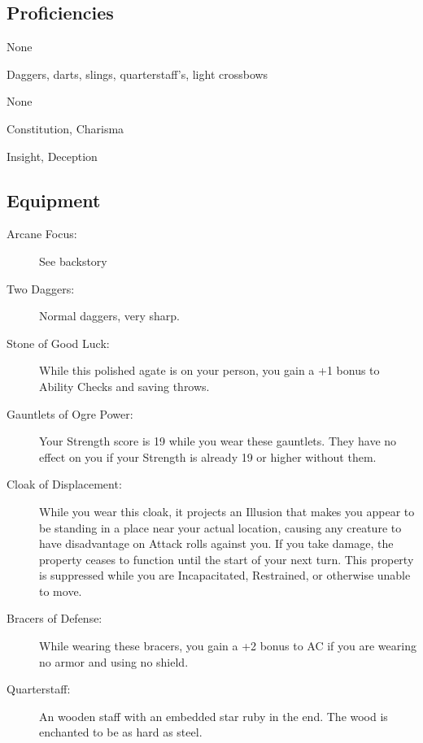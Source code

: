 \documentclass[letterpaper,10pt,twoside,twocolumn,openany]{book}
\begin{document}
\subsection{Proficiencies}

\begin{description}[font=\normalfont\textbf,noitemsep,topsep=1ex,leftmargin=1em]
	\item[Armor:] None
	\item[Weapons:] Daggers, darts, slings, quarterstaff's, light crossbows 
	\item[Tools:] None 
\end{description}

\begin{description}[font=\normalfont\textbf,noitemsep,topsep=1ex,leftmargin=1em]
	\item[Saving Throws:] Constitution, Charisma
	\item[Skills:] Insight, Deception
\end{description}

\subsection{Equipment}

\begin{description}
	\item[Arcane Focus:] See backstory
	\item[Two Daggers:] Normal daggers, very sharp.
	\item[Stone of Good Luck:] While this polished agate is on your person, you gain a +1 bonus to Ability Checks and saving throws.
	\item[Gauntlets of Ogre Power:] Your Strength score is 19 while you wear these gauntlets. They have no effect on you if your Strength is already 19 or higher without them.
	\item[Cloak of Displacement:] While you wear this cloak, it projects an Illusion that makes you appear to be standing in a place near your actual location, causing any creature to have disadvantage on Attack rolls against you. If you take damage, the property ceases to function until the start of your next turn. This property is suppressed while you are Incapacitated, Restrained, or otherwise unable to move.
	\item[Bracers of Defense:] While wearing these bracers, you gain a +2 bonus to AC if you are wearing no armor and using no shield.
	\item[Quarterstaff:] An wooden staff with an embedded star ruby in the end. The wood is enchanted to be as hard as steel.
\end{description}
\end{document}

